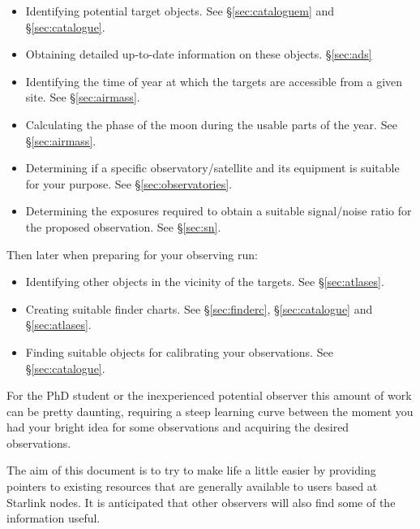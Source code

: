 \documentclass[twoside,11pt]{article}
\newcommand{\htmladdnormallink}[2]{#1}
\newcommand{\STARLINKref}{\htmladdnormallink{Starlink}{http://star-www.rl.ac.uk/}}
\begin{document}
\begin{itemize}
\item Identifying potential target objects. See \S{\ref{sec:cataloguem}} and \S{\ref{sec:catalogue}}.

\item Obtaining detailed up-to-date information on these objects. \S{\ref{sec:ads}} 

\item Identifying the time of year at which the targets are accessible
      from a given site. See \S{\ref{sec:airmass}}.

\item Calculating the phase of the moon during the usable parts of the year. See 
      \S{\ref{sec:airmass}}.

\item Determining if a specific observatory/satellite and its 
      equipment is suitable for your purpose. See \S{\ref{sec:observatories}}.

\item Determining the exposures required to obtain
      a suitable signal/noise ratio for the proposed observation. See \S{\ref{sec:sn}}.
	
\end{itemize}

Then later when preparing for your observing run:

\begin{itemize}
\item Identifying other objects in the vicinity of the targets. See \S{\ref{sec:atlases}}.

\item Creating suitable finder charts. See \S{\ref{sec:finderc}}, \S{\ref{sec:catalogue}} and
      \S{\ref{sec:atlases}}.

\item Finding suitable objects for calibrating your observations. See \S{\ref{sec:catalogue}}.
\end{itemize}

For the PhD student or the inexperienced potential observer this amount of
work can be pretty daunting, requiring a steep learning curve between the
moment you had your bright idea for some observations and acquiring 
the desired observations.

The aim of this document is to try to make life a little easier by 
providing pointers to existing resources that are generally available 
to users based at {\STARLINKref} nodes. It is anticipated that other 
observers will also find some of the information useful. 
\end{document}
